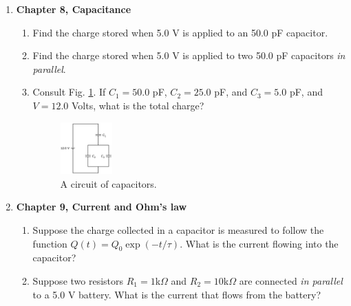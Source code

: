 \documentclass[10pt]{article}
\begin{document}
\begin{enumerate}
\item \textbf{Chapter 8, Capacitance}
\begin{enumerate}
\item Find the charge stored when 5.0 V is applied to an 50.0 pF capacitor. \\ \vspace{1cm}
\item Find the charge stored when 5.0 V is applied to two 50.0 pF capacitors \textit{in parallel}. \\ \vspace{1cm}
\item Consult Fig. \ref{fig:cap2}.  If $C_1 = 50.0$ pF, $C_2 = 25.0$ pF, and $C_3 = 5.0$ pF, and $V=12.0$ Volts, what is the total charge? \\ \vspace{1.5cm}
\begin{figure}
\centering
\includegraphics[width=0.2\textwidth]{figures/cap2.png}
\caption{\label{fig:cap2} A circuit of capacitors.}
\end{figure}
\end{enumerate}
\item \textbf{Chapter 9, Current and Ohm's law}
\begin{enumerate}
\item Suppose the charge collected in a capacitor is measured to follow the function $Q(t) = Q_0 \exp(-t/\tau)$.  What is the current flowing into the capacitor? \\ \vspace{1cm}
\item Suppose two resistors $R_1=1$k$\Omega$ and $R_2=10$k$\Omega$ are connected \textit{in parallel} to a 5.0 V battery.  What is the current that flows from the battery?
\end{enumerate}
\end{enumerate}
\end{document}
